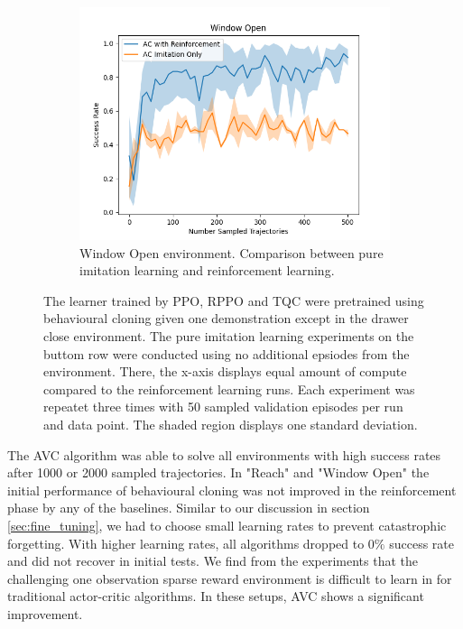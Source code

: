 \begin{figure}[htbp]
\begin{subfigure}[t]{0.45\textwidth}
      \includegraphics[width=\textwidth]{images/1_2000_imi/Window Open.png}
      \caption{Window Open environment. Comparison between pure imitation learning and reinforcement learning.}
    \end{subfigure}
    \caption{
    The learner trained by PPO, RPPO and TQC were pretrained using behavioural cloning given one demonstration except in the drawer close environment. 
    The pure imitation learning experiments on the buttom row were conducted using no additional epsiodes from the environment. There, the x-axis 
    displays equal amount of compute compared to the reinforcement learning runs.
    Each experiment was repeatet three times with 
    50 sampled validation episodes per run and data point. The shaded region displays one standard deviation.}
    \label{fig:guided_ref}
\end{figure}

The AVC algorithm was able to solve all environments with high success rates after 1000 or 2000 sampled trajectories. In "Reach" and "Window Open" the initial performance
of behavioural cloning was not improved in the reinforcement phase by any of the baselines. Similar to our discussion in section \ref{sec:fine_tuning},
we had to choose small learning rates to prevent catastrophic forgetting. With higher learning rates, all algorithms dropped to $0 \%$ success rate and did
not recover in initial tests. We find from the experiments that the challenging one observation sparse reward environment is difficult to learn in for
traditional actor-critic algorithms. In these setups, AVC shows a significant improvement.\\

